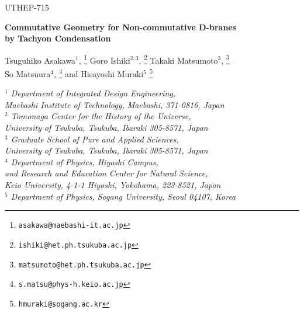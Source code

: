 \documentclass[12pt]{article}
\numberwithin{equation}{section}
\begin{document}
\begin{titlepage}

\setcounter{page}{0}
\renewcommand{\thefootnote}{\fnsymbol{footnote}}

\begin{flushright}
	{\small UTHEP-715} \\
\end{flushright}

\begin{center}
{\large\bf
Commutative Geometry for Non-commutative D-branes\\ by Tachyon Condensation\\
}

\vspace{5mm}
Tsuguhiko Asakawa$^{1}$,%
\footnote{\tt asakawa@maebashi-it.ac.jp}
Goro Ishiki$^{2,3}$,%
\footnote{\tt ishiki@het.ph.tsukuba.ac.jp}
Takaki Matsumoto$^{3}$,%
\footnote{\tt  matsumoto@het.ph.tsukuba.ac.jp}\\
So Matsuura$^{4}$,%
\footnote{\tt s.matsu@phys-h.keio.ac.jp}
and
Hisayoshi Muraki$^{5}$%
\footnote{\tt hmuraki@sogang.ac.kr}


\vspace{5mm}

{\small{\it
$^{1}$ Department of Integrated Design Engineering,\\
Maebashi Institute of Technology,
Maebashi, 371-0816, Japan \\
$^{2}$ Tomonaga Center for the History of the Universe, \\
University of Tsukuba, Tsukuba, Ibaraki 305-8571, Japan \\
$^{3}$ Graduate School of Pure and Applied Sciences, \\
University of Tsukuba, Tsukuba, Ibaraki 305-8571, Japan \\
$^{4}$  Department of Physics, Hiyoshi Campus, \\ 
and Research and Education Center for Natural Science, \\
Keio University, 4-1-1 Hiyoshi, Yokohama, 223-8521, Japan \\
$^{5}$ Department of Physics, Sogang University, Seoul 04107, Korea 
}}
\end{center}


\end{titlepage}
\end{document}
